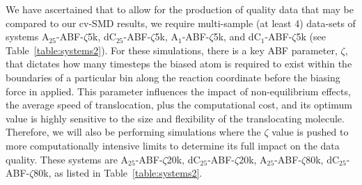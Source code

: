 \documentclass[a4paper,10pt]{article}
\newcommand{\dctfnsp}{dC$_{25}$}
\newcommand{\atfnsp}{A$_{25}$}
\newcommand{\dconsp}{dC$_{1}$}
\newcommand{\aonsp}{A$_{1}$}
\begin{document}




We have ascertained that to allow for the production of quality data that may be compared to our cv-SMD results, we require multi-sample (at least 4) data-sets of systems  \atfnsp-ABF-$\zeta$5k, \dctfnsp-ABF-$\zeta$5k,  \aonsp-ABF-$\zeta$5k,  and \dconsp-ABF-$\zeta$5k (see Table~\ref{table:systems2}). For these simulations, there is a key ABF parameter, $\zeta$, that dictates how many timesteps the biased atom is required to exist within the boundaries of a particular bin along the reaction coordinate before the biasing force in applied. This parameter influences the impact of non-equilibrium effects, the average speed of translocation, plus the computational cost, and its optimum value is highly sensitive to the size and flexibility of the translocating molecule. Therefore, we will also be performing simulations where the $\zeta$ value is pushed to more computationally intensive limits to determine its full impact on the data quality. These systems are \atfnsp-ABF-$\zeta$20k, \dctfnsp-ABF-$\zeta$20k,  \atfnsp-ABF-$\zeta$80k, \dctfnsp-ABF-$\zeta$80k, as listed in Table~\ref{table:systems2}.
\end{document}
